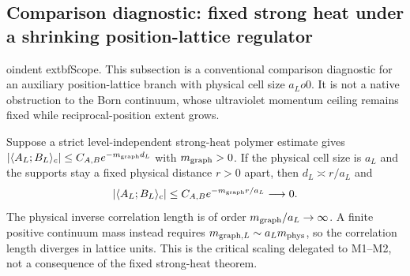 \documentclass[12pt,a4paper]{article}
\begin{document}
\subsection{Comparison diagnostic: fixed strong heat under a shrinking position-lattice regulator}
\label{p12:app:fixed-strong-heat-scaling-boundary}


oindent	extbf{Scope.}  This subsection is a conventional comparison diagnostic for an auxiliary position-lattice branch with physical cell size \(a_L	o0\).  It is not a native obstruction to the Born continuum, whose ultraviolet momentum ceiling remains fixed while reciprocal-position extent grows.

Suppose a strict level-independent strong-heat polymer estimate gives
$|\langle A_L;B_L\rangle_c|\le C_{A,B}e^{-m_{\rm graph}d_L}$ with
$m_{\rm graph}>0$.  If the physical cell size is $a_L$ and the supports stay
a fixed physical distance $r>0$ apart, then $d_L\asymp r/a_L$ and
\[
 |\langle A_L;B_L\rangle_c|
 \le C_{A,B}e^{-m_{\rm graph}r/a_L}\longrightarrow0.
\]
The physical inverse correlation length is of order
$m_{\rm graph}/a_L\to\infty$.  A finite positive continuum mass instead
requires $m_{{\rm graph},L}\sim a_Lm_{\rm phys}$, so the correlation length
diverges in lattice units.  This is the critical scaling delegated to M1--M2,
not a consequence of the fixed strong-heat theorem.


\end{document}

